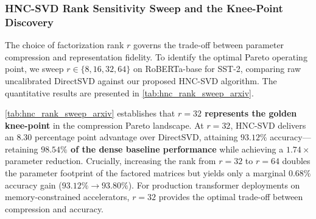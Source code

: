 \subsubsection{HNC-SVD Rank Sensitivity Sweep and the Knee-Point Discovery}
\label{sec:results_hnc_rank_sweep}

The choice of factorization rank $r$ governs the trade-off between parameter compression and representation fidelity. To identify the optimal Pareto operating point, we sweep $r \in \{8, 16, 32, 64\}$ on RoBERTa-base for SST-2, comparing raw uncalibrated DirectSVD against our proposed HNC-SVD algorithm. The quantitative results are presented in \cref{tab:hnc_rank_sweep_arxiv}.

\begin{table}[t]
\centering
\small
\caption[Rank Sensitivity Sweep]{\textbf{Rank Sensitivity Sweep: DirectSVD vs HNC-SVD on RoBERTa-base (SST-2).} Dense baseline accuracy is $94.50\%$ ($F_1 = 0.9458$). Relative Frobenius error $\epsilon_{\text{Frob}}$ and representation cosine similarity $\cos(\mat{H}_{\text{orig}}, \mat{H}_{\text{comp}})$ are evaluated across all hidden states.}
\label{tab:hnc_rank_sweep_arxiv}
\end{table}

\cref{tab:hnc_rank_sweep_arxiv} establishes that \textbf{$r=32$ represents the golden knee-point} in the compression Pareto landscape. At $r=32$, HNC-SVD delivers an $8.30$ percentage point advantage over DirectSVD, attaining $93.12\%$ accuracy---retaining \textbf{$98.54\%$ of the dense baseline performance} while achieving a $1.74\times$ parameter reduction. Crucially, increasing the rank from $r=32$ to $r=64$ doubles the parameter footprint of the factored matrices but yields only a marginal $0.68\%$ accuracy gain ($93.12\% \to 93.80\%$). For production transformer deployments on memory-constrained accelerators, $r=32$ provides the optimal trade-off between compression and accuracy.

